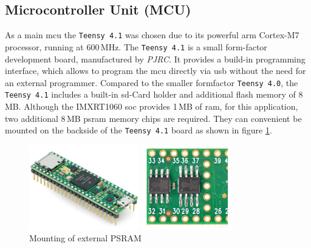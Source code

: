 \subsection{Microcontroller Unit (MCU)}
As a main \acrshort{mcu} the \texttt{Teensy 4.1} was chosen due to its powerful \acrshort{arm} Cortex-M7 processor, running at 600\,MHz.
The \texttt{Teensy 4.1} is a small form-factor development board, manufactured by \textit{PJRC}.
It provides a build-in programming interface, which allows to program the \acrshort{mcu} directly via \acrshort{usb} without the need for an external programmer.
Compared to the smaller formfactor \texttt{Teensy 4.0}, the \texttt{Teensy 4.1} includes a built-in \acrshort{sd}-Card holder and additional flash memory of 8\,MB.
Although the IMXRT1060 \acrshort{soc} provides 1\,MB of \acrshort{ram}, for this application, two additional 8\,MB \acrshort{psram} memory chips are required.
They can convenient be mounted on the backside of the \texttt{Teensy 4.1} board as shown in figure \ref{fig:teensy_psram}.
\begin{figure}[h!]
	\centering
	\begin{minipage}{0.49\textwidth}
		\centering
		\includegraphics[height=3.7cm]{images/4_design_acquisition_system/teensy_image.png}
		\vspace{-0.2cm}
		\caption{Teensy 4.1}
		\label{fig:teensy_4_1}
	\end{minipage}
	\begin{minipage}{0.49\textwidth}
		\centering
		\includegraphics[height=3.7cm]{images/4_design_acquisition_system/teensy_psram.png}
		\vspace{-0.2cm}
		\caption{Mounting of external PSRAM}
		\label{fig:teensy_psram}
	\end{minipage}
\end{figure}
\newpage

